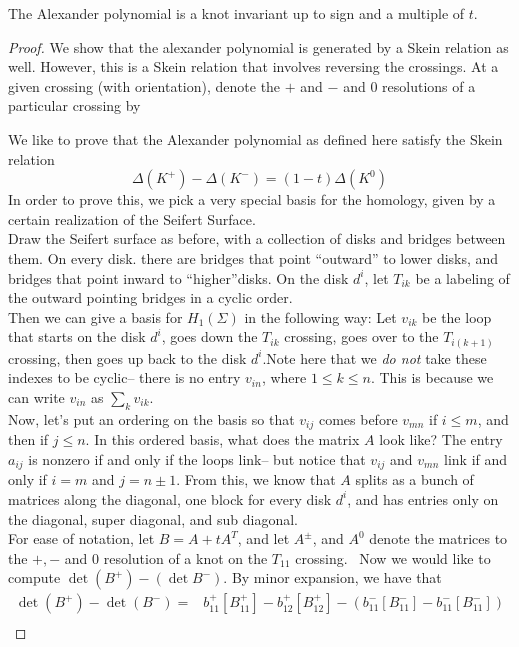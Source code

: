 \begin{claim}
The Alexander polynomial is a knot invariant up to sign and a multiple of $t$. 
\end{claim}
\begin{proof}
We show that the alexander polynomial is generated by a Skein relation as well. However, this is a Skein relation that involves reversing the crossings. At a given crossing (with orientation), denote the $+$  and $-$ and $0$ resolutions of a particular crossing by 

We like to prove that the Alexander polynomial as defined here satisfy the Skein relation 
\[\Delta(K^+)-\Delta(K^-)=(1-t)\Delta(K^0)\]
In order to prove this, we pick a very special basis for the homology, given by a certain realization of the Seifert Surface. \\
Draw the Seifert surface as before, with a collection of disks and bridges between them. On every disk. there are bridges that point ``outward'' to lower disks, and bridges that point inward to ``higher''disks. On the disk $d^i$, let $T_{ik}$ be a labeling of the outward pointing bridges in a cyclic order. \\
Then we can give a basis for $H_1(\Sigma)$ in the following way: Let $v_{ik}$ be the loop that starts on the disk $d^i$, goes down the $T_{ik}$ crossing, goes over to the $T_{i(k+1)}$ crossing, then goes up back to the disk $d^i$.Note here that we \emph{do not} take these indexes to be cyclic-- there is no entry $v_{in}$, where $1\leq k \leq n$.  This is because we can write $v_{in}$ as $\sum_k v_{ik}$. \\
Now, let's put an ordering on the basis so that $v_{ij}$ comes before $v_{mn}$ if $i\leq m$, and then if $j\leq n$. In this ordered basis, what does the matrix $A$ look like? The entry $a_{ij}$ is nonzero if and only if the loops link-- but notice that $v_{ij}$ and $v_{mn}$ link if and only if $i=m$ and $j=n\pm 1$. From this, we know that $A$ splits as a bunch of matrices along the diagonal, one block for every disk $d^i$, and has entries only on the diagonal, super diagonal, and sub diagonal.\\
For ease of notation, let $B=A+tA^T$, and let $A^\pm$, and $A^0$ denote the matrices to the $+, -$ and $0$ resolution of a knot on the $T_{11}$ crossing. \
Now we would like to compute $\det (B^+)- (\det B^-)$. By minor expansion, we have that 
\begin{align*}
\det (B^+)-\det(B^-)=& b_{11}^+ [B^+_{11}]-b^+_{12}[B^+_{12}]-(b_{11}^-[B^-_{11}]-b^-_{11}[B^-_{11}])\\

\end{align*}
\end{proof}
